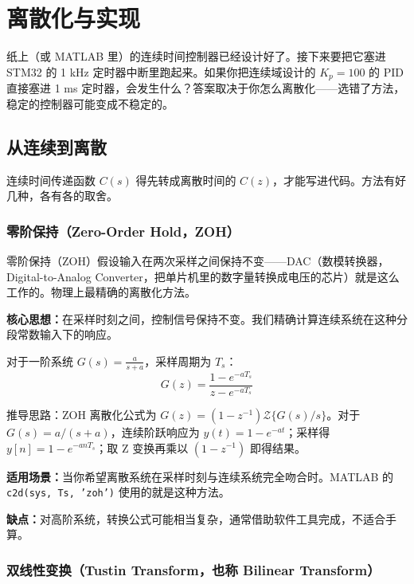 \section{离散化与实现}

纸上（或 MATLAB 里）的连续时间控制器已经设计好了。接下来要把它塞进 STM32 的 1 kHz 定时器中断里跑起来。如果你把连续域设计的 $K_p = 100$ 的 PID 直接塞进 1 ms 定时器，会发生什么？答案取决于你怎么离散化——选错了方法，稳定的控制器可能变成不稳定的。

\subsection{从连续到离散}

连续时间传递函数 $C(s)$ 得先转成离散时间的 $C(z)$，才能写进代码。方法有好几种，各有各的取舍。

\subsubsection{零阶保持（Zero-Order Hold，ZOH）}

零阶保持（ZOH）假设输入在两次采样之间保持不变——DAC（数模转换器，Digital-to-Analog Converter，把单片机里的数字量转换成电压的芯片）就是这么工作的。物理上最精确的离散化方法。

\textbf{核心思想：}在采样时刻之间，控制信号保持不变。我们精确计算连续系统在这种分段常数输入下的响应。

对于一阶系统 $G(s) = \frac{a}{s + a}$，采样周期为 $T_s$：
\begin{equation}
G(z) = \frac{1 - e^{-aT_s}}{z - e^{-aT_s}}
\end{equation}

推导思路：ZOH 离散化公式为 $G(z) = (1-z^{-1})\mathcal{Z}\{G(s)/s\}$。对于 $G(s) = a/(s+a)$，连续阶跃响应为 $y(t) = 1 - e^{-at}$；采样得 $y[n] = 1 - e^{-anT_s}$；取 Z 变换再乘以 $(1-z^{-1})$ 即得结果。

\textbf{适用场景：}当你希望离散系统在采样时刻与连续系统完全吻合时。MATLAB 的 \texttt{c2d(sys, Ts, 'zoh')} 使用的就是这种方法。

\textbf{缺点：}对高阶系统，转换公式可能相当复杂，通常借助软件工具完成，不适合手算。

\subsubsection{双线性变换（Tustin Transform，也称 Bilinear Transform）}


